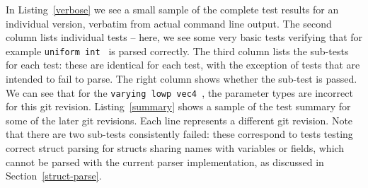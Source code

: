 \documentclass[12pt,twoside,notitlepage]{report}
\begin{document}
In Listing~\ref{verbose} we see a small sample of the complete test results for an individual version, verbatim from actual command line output. The second column lists individual tests -- here, we see some very basic tests verifying that for example {\tt uniform int } is parsed correctly. The third column lists the sub-tests for each test: these are identical for each test, with the exception of tests that are intended to fail to parse. The right column shows whether the sub-test is passed. We can see that for the { \tt varying lowp vec4 }, the parameter types are incorrect for this git revision. Listing~\ref{summary} shows a sample of the test summary for some of the later git revisions. Each line represents a different git revision. Note that there are two sub-tests consistently failed: these correspond to tests testing correct struct parsing for structs sharing names with variables or fields, which cannot be parsed with the current parser implementation, as discussed in Section~\ref{struct-parse}.
\end{document}
